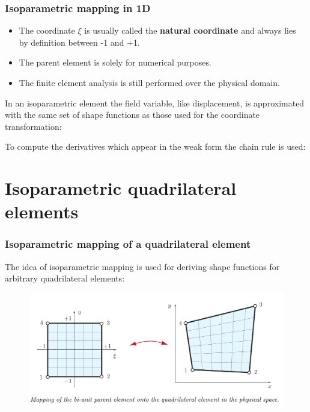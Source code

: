 \documentclass[notes]{beamer}
\begin{document}
\begin{frame}
\frametitle{Isoparametric mapping in 1D}

\begin{itemize}
	\item The coordinate $\xi$ is usually called the \textbf{natural coordinate} and always lies by definition between -1 and +1.
	
	\item The parent element is solely for numerical purposes. 
	
	\item The finite element analysis is still performed over the physical domain.
\end{itemize}


In an isoparametric element the field variable, like displacement, is approximated with the
same set of shape functions as those used for the coordinate transformation:


To compute the derivatives which appear in the weak form the chain rule is used:

\end{frame}


\section{Isoparametric quadrilateral elements}
\begin{frame}
\frametitle{Isoparametric mapping of a quadrilateral element}
The idea of isoparametric mapping is used for deriving shape functions for arbitrary quadrilateral elements:
\begin{figure}[ht]
	\centering
	\includegraphics[width=\textwidth]{figs/2d-isoparametric-shapefn.png}
\end{figure}
\end{frame}
\end{document}

